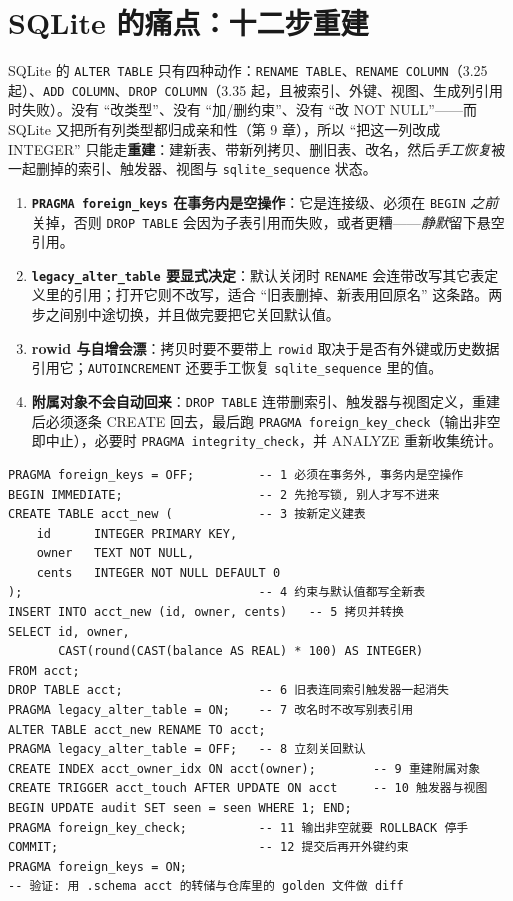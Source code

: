 \documentclass[12pt,a4paper,fontset=fandol]{ctexbook}
\newcommand{\Tp}[1]{\texttt{#1}}
\begin{document}
\section{SQLite 的痛点：十二步重建}

SQLite 的 \texttt{ALTER TABLE} 只有四种动作：\texttt{RENAME TABLE}、\texttt{RENAME COLUMN}（3.25 起）、\texttt{ADD COLUMN}、\texttt{DROP COLUMN}（3.35 起，且被索引、外键、视图、生成列引用时失败）。没有 ``改类型''、没有 ``加/删约束''、没有 ``改 NOT NULL''——而 SQLite 又把所有列类型都归成亲和性（第 9 章），所以 ``把这一列改成 INTEGER'' 只能走\textbf{重建}：建新表、带新列拷贝、删旧表、改名，然后\emph{手工恢复}被一起删掉的索引、触发器、视图与 \Tp{sqlite\_sequence} 状态。

\begin{warning}[title=重建的四个真实陷阱]
\begin{enumerate}
  \item \textbf{\Tp{PRAGMA foreign\_keys} 在事务内是空操作}：它是连接级、必须在 \texttt{BEGIN} \emph{之前}关掉，否则 \texttt{DROP TABLE} 会因为子表引用而失败，或者更糟——\emph{静默}留下悬空引用。
  \item \textbf{\Tp{legacy\_alter\_table} 要显式决定}：默认关闭时 \texttt{RENAME} 会连带改写其它表定义里的引用；打开它则不改写，适合 ``旧表删掉、新表用回原名'' 这条路。两步之间别中途切换，并且做完要把它关回默认值。
  \item \textbf{rowid 与自增会漂}：拷贝时要不要带上 \texttt{rowid} 取决于是否有外键或历史数据引用它；\texttt{AUTOINCREMENT} 还要手工恢复 \Tp{sqlite\_sequence} 里的值。
  \item \textbf{附属对象不会自动回来}：\texttt{DROP TABLE} 连带删索引、触发器与视图定义，重建后必须逐条 CREATE 回去，最后跑 \Tp{PRAGMA foreign\_key\_check}（输出非空即中止），必要时 \Tp{PRAGMA integrity\_check}，并 ANALYZE 重新收集统计。
\end{enumerate}
\end{warning}

\begin{lstlisting}[style=sqlstyle,caption={SQLite：把文本列重建成整型列的完整十二步}]
PRAGMA foreign_keys = OFF;         -- 1 必须在事务外, 事务内是空操作
BEGIN IMMEDIATE;                   -- 2 先抢写锁, 别人才写不进来
CREATE TABLE acct_new (            -- 3 按新定义建表
    id      INTEGER PRIMARY KEY,
    owner   TEXT NOT NULL,
    cents   INTEGER NOT NULL DEFAULT 0
);                                 -- 4 约束与默认值都写全新表
INSERT INTO acct_new (id, owner, cents)   -- 5 拷贝并转换
SELECT id, owner,
       CAST(round(CAST(balance AS REAL) * 100) AS INTEGER)
FROM acct;
DROP TABLE acct;                   -- 6 旧表连同索引触发器一起消失
PRAGMA legacy_alter_table = ON;    -- 7 改名时不改写别表引用
ALTER TABLE acct_new RENAME TO acct;
PRAGMA legacy_alter_table = OFF;   -- 8 立刻关回默认
CREATE INDEX acct_owner_idx ON acct(owner);        -- 9 重建附属对象
CREATE TRIGGER acct_touch AFTER UPDATE ON acct     -- 10 触发器与视图
BEGIN UPDATE audit SET seen = seen WHERE 1; END;
PRAGMA foreign_key_check;          -- 11 输出非空就要 ROLLBACK 停手
COMMIT;                            -- 12 提交后再开外键约束
PRAGMA foreign_keys = ON;
-- 验证: 用 .schema acct 的转储与仓库里的 golden 文件做 diff
\end{lstlisting}
\end{document}

